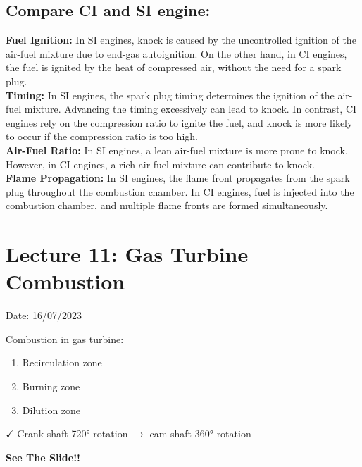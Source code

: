 \documentclass{article}
\begin{document}
\subsection*{Compare CI and SI engine:}
\textbf{Fuel Ignition:} In SI engines, knock is caused by the uncontrolled ignition of the air-fuel mixture due to end-gas autoignition. On the other hand, in CI engines, the fuel is ignited by the heat of compressed air, without the need for a spark plug.\\

\textbf{Timing:} In SI engines, the spark plug timing determines the ignition of the air-fuel mixture. Advancing the timing excessively can lead to knock. In contrast, CI engines rely on the compression ratio to ignite the fuel, and knock is more likely to occur if the compression ratio is too high.\\

\textbf{Air-Fuel Ratio:} In SI engines, a lean air-fuel mixture is more prone to knock. However, in CI engines, a rich air-fuel mixture can contribute to knock.\\

\textbf{Flame Propagation:} In SI engines, the flame front propagates from the spark plug throughout the combustion chamber. In CI engines, fuel is injected into the combustion chamber, and multiple flame fronts are formed simultaneously.\\ 

\section{Lecture 11: Gas Turbine Combustion} 
\hfill Date: 16/07/2023

Combustion in gas turbine: 
\begin{enumerate}
  \item Recirculation zone 
  \item Burning zone
  \item Dilution zone 
\end{enumerate}

$\checkmark $ Crank-shaft 720° rotation $\rightarrow$ cam shaft 360° rotation  

\textbf{See The Slide!!}
\end{document}
